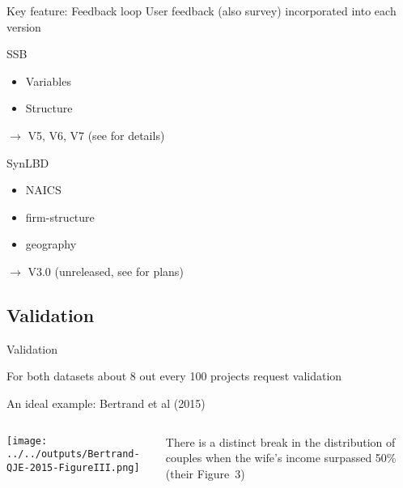 \begin{frame}{Key feature: Feedback loop}
User feedback (also survey) incorporated into each version
\begin{block}{SSB}
\begin{itemize}
	\item Variables
	\item Structure
\end{itemize}
$\rightarrow$ V5, V6, V7 (see \cite{CreationSSBv7} for details)
\end{block}
\begin{block}{SynLBD}
\begin{itemize}
	\item NAICS
	\item firm-structure
	\item geography 
\end{itemize}
$\rightarrow$ V3.0 (unreleased, see \cite{RePEc:cen:wpaper:14-12} for plans)
\end{block}	
\end{frame}



\subsection{Validation}


\begin{frame}{Validation}
\begin{block}{For both datasets}
about 8 out every 100 projects request validation
\end{block}
\end{frame}


\begin{frame}{An ideal example: Bertrand et al (2015)}
\begin{block}{\cite{Bertrand29012015}}
\begin{columns}
\begin{column}{.5\textwidth}
	\texttt{[image: ../../outputs/Bertrand-QJE-2015-FigureIII.png]}
\end{column}
\begin{column}{.45\textwidth}
	There is a distinct break in the distribution of couples 
when the wife's income surpassed 50\% (their Figure~3)

\end{column}
\end{columns}\end{block}
\end{frame}


